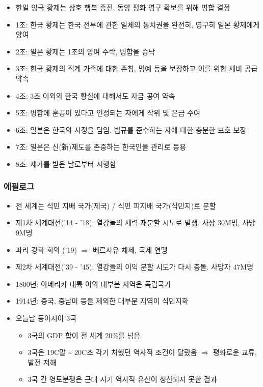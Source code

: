 \begin{itemize}
    \item 한일 양국 황제는 상호 행복 증진, 동양 평화 영구 확보를 위해 병합 결정
    \item 1조: 한국 황제는 한국 전부에 관한 일체의 통치권을 완전히, 영구히 일본 황제에게 양여
    \item 2조: 일본 황제는 1조의 양여 수락, 병합을 승낙
    \item 3조: 한국 황제의 직계 가족에 대한 존칭, 명예 등을 보장하고 이를 위한 세비 공급 약속
    \item 4조: 3조 이외의 한국 황실에 대해서도 자금 공여 약속
    \item 5조: 병합에 훈공이 있다고 인정되는 자에게 작위 및 은금 수여
    \item 6조: 일본은 한국의 시정을 담임, 법규를 준수하는 자에 대한 충분한 보호 보장
    \item 7조: 일본은 신(新)제도를 존중하는 한국인을 관리로 등용
    \item 8조: 재가를 받은 날로부터 시행함
\end{itemize}

\subsubsection*{에필로그}

\begin{itemize}
    \item 전 세계는 식민 지배 국가(제국) / 식민 피지배 국가(식민지)로 분할
    \item 제1차 세계대전('14 - '18): 열강들의 세력 재분할 시도로 발생. 사상 30M명, 사망 9M명
    \item 파리 강화 회의 ('19) $\Rightarrow$ 베르사유 체제, 국제 연맹
    \item 제2차 세계대전('39 - '45): 열강들의 이익 분할 시도가 다시 충돌. 사망자  47M명
    \item 1800년: 아메리카 대륙 이외 대부분 지역은 독립국가
    \item 1914년: 중국, 중남미 등을 제외한 대부분 지역이 식민지화
    \item 오늘날 동아시아 3국
    \begin{itemize}
        \item 3국의 GDP 합이 전 세계 20\%를 넘음
        \item 3국은 19C말 \textasciitilde{} 20C초 각기 처했던 역사적 조건이 달랐음
            $\Rightarrow$ 평화로운 교류, 발전 저해
        \item 3국 간 영토분쟁은 근대 시기 역사적 유산이 청산되지 못한 결과
    \end{itemize}
\end{itemize}
